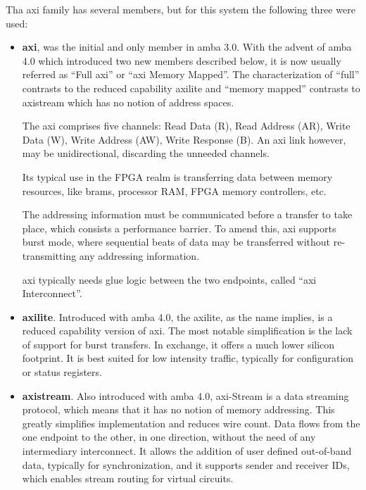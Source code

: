 Tha \gls{axi} family has several members, but for this system the following three were used:
\begin{itemize}
\item	\textbf{\gls{axi}}, was the initial and only member in \gls{amba} 3.0. 
	With the advent of \gls{amba} 4.0 which introduced
	two new members described below, it is now usually 
	referred as ``Full \gls{axi}'' or ``\gls{axi} Memory Mapped''.
	The characterization of ``full'' contrasts to 
	the reduced capability \gls{axilite} and ``memory mapped''
	contrasts to \gls{axistream} which has no notion of address spaces.

	The \gls{axi} comprises five channels: Read Data (R), Read Address (AR),
	Write Data (W), Write Address (AW), Write Response (B). An \gls{axi} link
	however, may be unidirectional, discarding the unneeded channels.

	Its typical use in the FPGA realm is transferring data between memory resources,
 	like \glspl{bram}, processor RAM, FPGA memory controllers, etc.

	The addressing information must be communicated before a transfer to take place, 
	which consists a performance barrier. 
	To amend this, \gls{axi} supports \gls{burst} mode, 
	where sequential \glspl{beat} of data may be transferred without 
	re-transmitting any addressing information.
	
	\gls{axi} typically needs glue logic 
	between the two endpoints, called ``\gls{axi} Interconnect''. 

\item	\textbf{\gls{axilite}}. Introduced with \gls{amba} 4.0, 
	the \gls{axilite}, as the  name implies,
	is a reduced capability version of \gls{axi}. 
	The most notable simplification is the 
	lack of support for \gls{burst} transfers. 
	In exchange, it offers a much lower silicon footprint. 
	It is best suited for low intensity traffic, 
	typically for configuration or status registers.

\item	\textbf{\gls{axistream}}. Also introduced with \gls{amba} 4.0, 
	\gls{axi}-Stream is a data streaming protocol,
	which means that it has no notion of memory addressing.
	This greatly simplifies implementation and reduces wire count.
	Data flows from the one endpoint to the other, in one direction, 
	without the need of any intermediary interconnect.
	It allows the addition of user defined out-of-band data,
	typically for synchronization, and it supports sender and receiver IDs, 
	which enables stream routing for virtual circuits.
\end{itemize}

